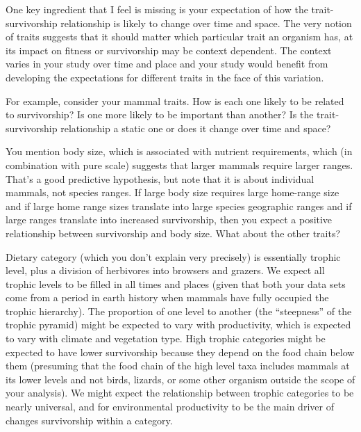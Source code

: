\documentclass{article}
\begin{document}
One key ingredient that I feel is missing is your expectation of how the trait-survivorship relationship is likely to change over time and space.  The  very notion of traits suggests that it should matter which particular trait an organism has, at its impact on fitness or survivorship may be context dependent.  The context varies in your study over time and place and your study would benefit from developing the expectations for different traits in the face of this variation.

For example, consider your mammal traits.  How is each one likely to be related to survivorship?  Is one more likely to be important than another?  Is the trait-survivorship relationship a static one or does it change over time and space? 

You mention body size, which is associated with nutrient requirements, which (in combination with pure scale) suggests that larger mammals require larger ranges.  That’s a good predictive hypothesis, but note that it is about individual mammals, not species ranges.  If large body size requires large home-range size and if large home range sizes translate into large species geographic ranges and if large ranges translate into increased survivorship, then you expect a positive relationship between survivorship and body size.  What about the other traits? 

Dietary category (which you don’t explain very precisely) is essentially trophic level, plus a division of herbivores into browsers and grazers.  We expect all trophic levels to be filled in all times and places (given that both your data sets come from a period in earth history when mammals have fully occupied the trophic hierarchy).  The proportion of one level to another (the “steepness” of the trophic pyramid) might be expected to vary with productivity, which is expected to vary with climate and vegetation type.  High trophic categories might be expected to have lower survivorship because they depend on the food chain below them (presuming that the food chain of the high level taxa includes mammals at its lower levels and not birds, lizards, or some other organism outside the scope of your analysis).  We might expect the relationship between trophic categories to be nearly universal, and for environmental productivity to be the main driver of changes survivorship within a category. 
\end{document}
